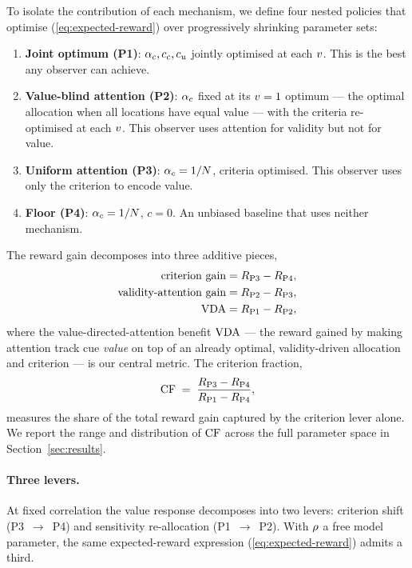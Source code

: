 To isolate the contribution of each mechanism, we define four nested
policies that optimise (\ref{eq:expected-reward}) over progressively
shrinking parameter sets:
\begin{enumerate}
\item \textbf{Joint optimum (P1)}: $\alpha_c, c_c, c_u$ jointly
  optimised at each $v$. This is the best any observer can achieve.
\item \textbf{Value-blind attention (P2)}: $\alpha_c$ fixed at its
  $v = 1$ optimum --- the optimal allocation when all locations have
  equal value --- with the criteria re-optimised at each $v$. This
  observer uses attention for validity but not for value.
\item \textbf{Uniform attention (P3)}: $\alpha_c = 1/N$, criteria
  optimised. This observer uses only the criterion to encode value.
\item \textbf{Floor (P4)}: $\alpha_c = 1/N$, $c = 0$. An unbiased
  baseline that uses neither mechanism.
\end{enumerate}
The reward gain decomposes into three additive pieces,
\begin{align}
  \text{criterion gain} &= R_{\mathrm{P3}} - R_{\mathrm{P4}},
  \label{eq:gain-criterion}\\
  \text{validity-attention gain} &= R_{\mathrm{P2}} - R_{\mathrm{P3}},
  \label{eq:gain-validity}\\
  \mathrm{VDA} &= R_{\mathrm{P1}} - R_{\mathrm{P2}},
  \label{eq:vda-def}
\end{align}
where the value-directed-attention benefit $\mathrm{VDA}$ --- the reward gained
by making attention track cue \emph{value} on top of an already
optimal, validity-driven allocation and criterion --- is our central
metric. The criterion fraction,
\begin{equation}
  \mathrm{CF} \;=\;
  \frac{R_{\mathrm{P3}} - R_{\mathrm{P4}}}{R_{\mathrm{P1}} - R_{\mathrm{P4}}},
  \label{eq:cf-def}
\end{equation}
measures the share of the total reward gain captured by the criterion
lever alone. We report the range and distribution of $\mathrm{CF}$ across the
full parameter space in Section~\ref{sec:results}.

\paragraph{Three levers.}
At fixed correlation the value response decomposes into two levers:
criterion shift (P3~$\to$~P4) and sensitivity re-allocation
(P1~$\to$~P2). With $\rho$ a free model parameter, the same
expected-reward expression (\ref{eq:expected-reward}) admits a third.

